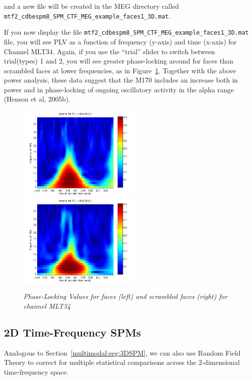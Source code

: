 and a new file will be created in the MEG directory called \texttt{mtf2\_\-cdbespm8\_\-SPM\_\-CTF\_\-MEG\_\-example\_\-faces1\_\-3D.mat}.

If you now display the file \texttt{mtf2\_\-cdbespm8\_\-SPM\_\-CTF\_\-MEG\_\-example\_\-faces1\_\-3D.mat} file, you will see PLV as a function of frequency (y-axis) and time (x-axis) for Channel MLT34. Again, if you use the ``trial'' slider to switch between trial(types) 1 and 2, you will see greater phase-locking around for faces than scrambled faces at lower frequencies, as in Figure~\ref{multimodal:fig:14}. Together with the above power analysis, these data suggest that the M170 includes an increase both in power and in phase-locking of ongoing oscillatory activity in the alpha range (Henson et al, 2005b).

\begin{figure}
\begin{center}
\includegraphics[width=60mm]{multimodal/figures/meg_plv_faces}
\includegraphics[width=60mm]{multimodal/figures/meg_plv_scrambled}
\caption{\em Phase-Locking Values for faces (left) and scrambled faces (right) for channel MLT34 \label{multimodal:fig:14}}
\end{center}
\end{figure}

\subsection{2D Time-Frequency SPMs}

Analogous to Section~\ref{multimodal:eeg:3DSPM}, we can also use Random Field Theory to correct for multiple statistical comparisons across the 2-dimensional time-frequency space.

